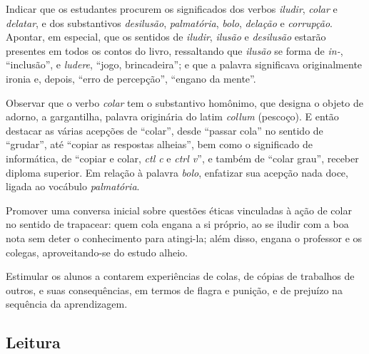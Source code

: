 Indicar que os estudantes procurem os significados dos verbos
\emph{iludir}, \emph{colar} e \emph{delatar}, e dos substantivos
\emph{desilusão}, \emph{palmatória}, \emph{bolo}, \emph{delação} e
\emph{corrupção}. Apontar, em especial, que os sentidos de
\emph{iludir}, \emph{ilusão} e \emph{desilusão} estarão presentes em
todos os contos do livro, ressaltando que \emph{ilusão} se forma de
\emph{in-}, ``inclusão'', e \emph{ludere}, ``jogo, brincadeira''; e que
a palavra significava originalmente ironia e, depois, ``erro de
percepção'', ``engano da mente''.

Observar que o verbo \emph{colar} tem o substantivo homônimo, que
designa o objeto de adorno, a gargantilha, palavra originária do latim
\emph{collum} (pescoço). E então destacar as várias acepções de
``colar'', desde ``passar cola'' no sentido de ``grudar'', até ``copiar
as respostas alheias'', bem como o significado de informática, de
``copiar e colar, \emph{ctl c} e \emph{ctrl v}'', e também de ``colar
grau'', receber diploma superior. Em relação à palavra \emph{bolo},
enfatizar sua acepção nada doce, ligada ao vocábulo \emph{palmatória}.

Promover uma conversa inicial sobre questões éticas vinculadas à ação de
colar no sentido de trapacear: quem cola engana a si próprio, ao se
iludir com a boa nota sem deter o conhecimento para atingi-la; além
disso, engana o professor e os colegas, aproveitando-se do estudo
alheio.

Estimular os alunos a contarem experiências de colas, de cópias de
trabalhos de outros, e suas consequências, em termos de flagra e
punição, e de prejuízo na sequência da aprendizagem.

\subsection{Leitura}

